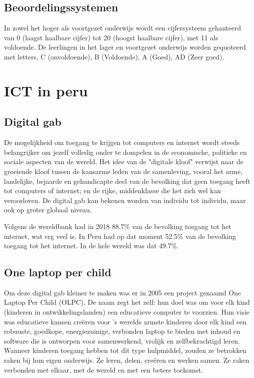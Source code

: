 \subsection{Beoordelingssystemen}
In zowel het hoger als voortgezet onderwijs wordt een cijfersysteem gehanteerd van 0 (laagst haalbare cijfer) tot 20 (hoogst haalbare cijfer), met 11 als voldoende.  De leerlingen in het lager en voortgezet onderwijs worden gequoteerd met letters, C (onvoldoende), B (Voldoende), A (Goed), AD (Zeer goed). \autocite{Nuffic2015}



\section{ICT in peru}
\subsection{Digital gab}
De mogelijkheid om toegang te krijgen tot computers en internet wordt steeds belangrijker om jezelf volledig onder te dompelen in de economische, politieke en sociale aspecten van de wereld. Het idee van de "digitale kloof" verwijst naar de groeiende kloof tussen de kansarme leden van de samenleving, vooral het arme, landelijke, bejaarde en gehandicapte deel van de bevolking dat geen toegang heeft tot computers of internet; en de rijke, middenklasse die het zich wel kan veroorloven. De digital gab kan bekenen worden van individu tot individu, maar ook op groter globaal niveau. \autocite{Marichick2000}

Volgens de wereldbank had in 2018 88.7\% van de bevolking toegang tot het internet, wat erg veel is. In Peru had op dat moment 52.5\% van de bevolking toegang tot het internet. In de hele wereld was dat 49.7\%. \autocite{WereldBank2018}

\subsection{One laptop per child}
Om deze digital gab kleiner te maken was er in 2005 een project genaamd One Laptop Per Child (OLPC). De naam zegt het zelf: hun doel was om voor elk kind (kinderen in ontwikkelingslanden) een educatieve computer te voorzien. Hun visie was educatieve kansen creëren voor 's werelds armste kinderen door elk kind een robuuste, goedkope, energiezuinige, verbonden laptop te bieden met inhoud en software die is ontworpen voor samenwerkend, vrolijk en zelfbekrachtigd leren. Wanneer kinderen toegang hebben tot dit type hulpmiddel, zouden ze betrokken raken bij hun eigen onderwijs. Ze leren, delen, creëren en werken samen. Ze raken verbonden met elkaar, met de wereld en met een betere toekomst. \autocite{OneLaptopPerChild2005}

